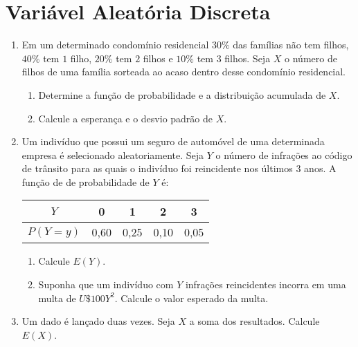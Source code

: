 
\section*{Variável Aleatória Discreta}

\begin{enumerate}
\item Em um determinado condomínio residencial $30\%$ das famílias não tem filhos, $40\%$ tem $1$ filho, $20\%$ tem $2$ filhos e $10\%$ tem $3$ filhos. Seja $X$ o número de filhos de uma família sorteada ao acaso dentro desse condomínio residencial.

    \begin{enumerate}[label=\alph*)]
		\item Determine a função de probabilidade e a distribuição acumulada de $X$.
		\item Calcule a esperança e o desvio padrão de $X$.
	\end{enumerate}

	\solv{}

\item Um indivíduo que possui um seguro de automóvel de uma determinada empresa é selecionado aleatoriamente. Seja $Y$ o número de infrações ao código de trânsito para as quais o indivíduo foi reincidente nos últimos $3$ anos. A função de de probabilidade de $Y$ é:
    \begin{table}[htpb]
        \centering
        \begin{tabular}{|c|c|c|c|c|}
            \hline
            $Y$      & 0    & 1    & 2    & 3    \\ \hline
            $P(Y=y)$ & 0,60 & 0,25 & 0,10 & 0,05 \\ \hline
        \end{tabular}
    \end{table}
    
    \begin{enumerate}[label=\alph*)]
		\item Calcule $E(Y)$.
		\item Suponha que um indivíduo com $Y$ infrações reincidentes incorra em uma multa de $U\$ 100Y^{2}$. Calcule o valor esperado da multa.
	\end{enumerate}

\setcounter{enumi}{4}
\item Um dado é lançado duas vezes. Seja $X$ a soma dos resultados. Calcule $E(X)$.
	

\end{enumerate}
